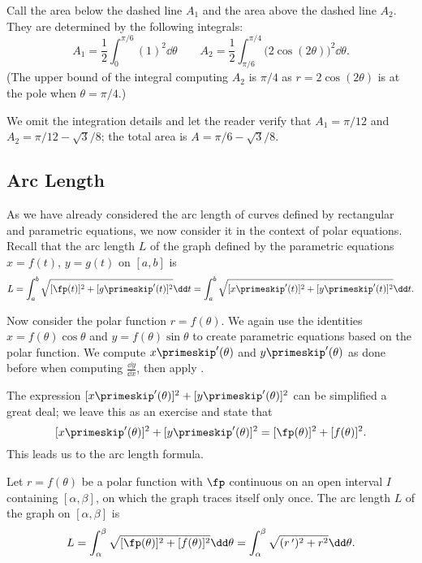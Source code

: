 \begin{example}
Call the area below the dashed line $A_1$ and the area above the dashed line $A_2$. They are determined by the following integrals:
\[
A_1 = \frac12\int_0^{\pi/6} (1)^2\dd\theta\qquad
A_2 = \frac12\int_{\pi/6}^{\pi/4} \bigl(2\cos(2\theta)\bigr)^2\dd\theta.
\]
(The upper bound of the integral computing $A_2$ is $\pi/4$ as $r=2\cos(2\theta)$ is at the pole when $\theta=\pi/4$.)

We omit the integration details and let the reader verify that $A_1 = \pi/12$ and $A_2 = \pi/12-\sqrt{3}/8$; the total area is $A = \pi/6-\sqrt{3}/8$.
\end{example}

\subsection{Arc Length}

As we have already considered the arc length of curves defined by rectangular and parametric equations, we now consider it in the context of polar equations. Recall that the arc length $L$ of the graph defined by the parametric equations $x=f(t)$, $y=g(t)$ on $[a,b]$ is
\begin{equation}
L = \int_a^b \sqrt{[\fp(t)]^2 + [g\primeskip'(t)]^2}\dd t = \int_a^b \sqrt{[x\primeskip'(t)]^2+[y\primeskip'(t)]^2}\dd t.
\label{eq:polar_arclength}
\end{equation}

Now consider the polar function $r=f(\theta)$. We again use the identities $x=f(\theta)\cos\theta$ and $y=f(\theta)\sin\theta$ to create parametric equations based on the polar function. We compute $x\primeskip'(\theta)$ and $y\primeskip'(\theta)$ as done before when computing $\frac{\dd y}{\dd x}$, then apply .

The expression $[x\primeskip'(\theta)]^2+[y\primeskip'(\theta)]^2$ can be simplified a great deal; we leave this as an exercise and state that
\[
[x\primeskip'(\theta)]^2+[y\primeskip'(\theta)]^2 = [\fp(\theta)]^2+[f(\theta)]^2.
\]
This leads us to the  arc length formula.

\begin{keyidea}\label{idea:polar_arclength}
Let  $r=f(\theta)$ be a polar function with $\fp$ continuous on an open interval $I$ containing $[\alpha,\beta]$, on which the graph traces itself only once. The arc length $L$ of the graph on $[\alpha,\beta]$ is
\[L = \int_\alpha^\beta \sqrt{[\fp(\theta)]^2+[f(\theta)]^2}\dd\theta = \int_\alpha^\beta\sqrt{(r\,')^2+ r^2}\dd\theta.\]
\end{keyidea}

